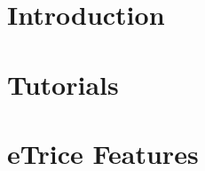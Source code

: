 \documentclass[a4paper,oneside,10pt]{book}
\title{\Huge \eTrice}
\author{\eTrice{} committers and contributors}
\DeclareRobustCommand{\eTrice}{{\color{blue}e}{\color{red}Trice}{}}
\begin{document}
\maketitle

\tableofcontents

\chapter{Introduction}




\chapter{Tutorials}












\chapter{\eTrice{} Features}


%
%
%



\end{document}
